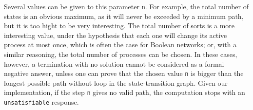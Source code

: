 Several values can be given to this parameter \texttt{n}.
For example, the total number of states is an obvious maximum,
as it will never be exceeded by a minimum path,
but it is too hight to be very interesting.
The total number of sorts is a more interesting value,
under the hypothesis that each one will change its active process at most once,
which is often the case for Boolean networks;
or, with a similar reasoning, the total number of processes can be chosen.
In these cases, however, a termination with no solution cannot be considered as a formal
negative answer, unless one can prove that the chosen value \texttt{n}
is bigger than the longest possible path without loop in the state-transition graph.
Given our implementation, if the step \texttt{n} gives no valid path,
the computation stops with an \texttt{unsatisfiable} response.
